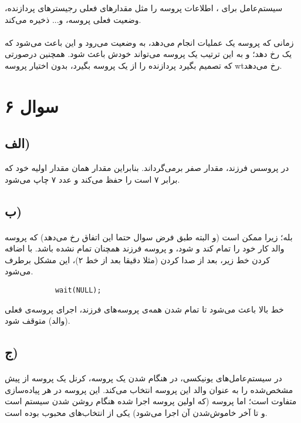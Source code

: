 \documentclass{article}
\begin{document}
	سیستم‌عامل برای
	،
	اطلاعات
	پروسه را مثل مقدارهای فعلی رجیسترهای پردازنده، وضعیت فعلی پروسه، و... ذخیره می‌کند.

	\paragraph*{}
	زمانی که پروسه یک عملیات
	انجام می‌دهد، به وضعیت
	می‌رود و این باعث می‌شود که یک
	رخ دهد؛ و به این ترتیب یک پروسه می‌تواند خودش باعث
	شود. همچنین درصورتی که
	تصمیم بگیرد پردازنده را از یک پروسه بگیرد،
	بدون اختیار پروسه wtرخ می‌دهد.

	\section*{سوال ۶}
	\subsection*{الف)}
	در پروسس فرزند،
	مقدار صفر برمی‌گرداند. بنابراین مقدار
	همان مقدار اولیه خود که برابر ۷ است را حفظ می‌کند و عدد ۷ چاپ می‌شود.

	\subsection*{ب)}
	\paragraph*{}
	بله؛ زیرا ممکن است (و البته طبق فرض سوال حتما این اتفاق رخ می‌دهد) که پروسه والد کار خود را تمام کند و
	شود، و پروسه فرزند همچنان تمام نشده باشد.
	با اضافه کردن خط زیر، بعد از صدا کردن
	(مثلا دقیقا بعد از خط ۲)، این مشکل برطرف می‌شود.

	\begin{latin}
		\begin{verbatim}
			wait(NULL);
		\end{verbatim}
	\end{latin}

	خط بالا باعث می‌شود تا تمام شدن همه‌ی پروسه‌های فرزند، اجرای پروسه‌ی فعلی (والد) متوقف شود.

	\subsection*{ج)}
	\paragraph*{}
	در سیستم‌عامل‌های یونیکسی، در هنگام
	شدن یک پروسه، کرنل یک پروسه از پیش مشخص‌شده را به عنوان والد این پروسه انتخاب می‌کند. این پروسه در هر پیاده‌سازی متفاوت است؛ اما پروسه
	(که اولین پروسه اجرا شده هنگام روشن شدن سیستم است و تا آخر خاموش‌شدن آن اجرا می‌شود) یکی از انتخاب‌های محبوب بوده است.
\end{document}
